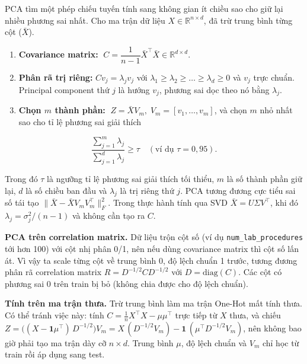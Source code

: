 \documentclass[a4paper]{report}
\begin{document}
PCA tìm một phép chiếu tuyến tính sang không gian ít chiều sao cho giữ lại nhiều phương sai nhất. Cho ma trận dữ liệu $X \in \mathbb{R}^{n \times d}$, đã trừ trung bình từng cột ($\bar{X}$).

\begin{enumerate}
  \item \textbf{Covariance matrix:} $\;C = \dfrac{1}{n-1}\bar{X}^{\top}\bar{X} \in \mathbb{R}^{d\times d}$.
  \item \textbf{Phân rã trị riêng:} $C v_j = \lambda_j v_j$ với $\lambda_1 \ge \lambda_2 \ge \dots \ge \lambda_d \ge 0$ và $v_j$ trực chuẩn. Principal component thứ $j$ là hướng $v_j$, phương sai dọc theo nó bằng $\lambda_j$.
  \item \textbf{Chọn $m$ thành phần:} $\;Z = \bar{X} V_m,\; V_m = [v_1,\dots,v_m]$, và chọn $m$ nhỏ nhất sao cho tỉ lệ phương sai giải thích
\end{enumerate}

\begin{equation}
  \frac{\sum_{j=1}^{m}\lambda_j}{\sum_{j=1}^{d}\lambda_j} \ge \tau \quad(\text{ví dụ } \tau = 0{,}95).
\end{equation}

Trong đó $\tau$ là ngưỡng tỉ lệ phương sai giải thích tối thiểu, $m$ là số thành phần giữ lại, $d$ là số chiều ban đầu và $\lambda_j$ là trị riêng thứ $j$. PCA tương đương cực tiểu sai số tái tạo $\lVert \bar{X} - \bar{X}V_mV_m^{\top}\rVert_F^2$. Trong thực hành tính qua SVD $\bar{X} = U\Sigma V^{\top}$, khi đó $\lambda_j = \sigma_j^2/(n-1)$ và không cần tạo ra $C$.

\textbf{PCA trên correlation matrix.} Dữ liệu trộn cột số (ví dụ \texttt{num\_\allowbreak{}lab\_\allowbreak{}procedures} tới hơn 100) với cột nhị phân 0/1, nên nếu dùng covariance matrix thì cột số lấn át. Vì vậy ta scale từng cột về trung bình 0, độ lệch chuẩn 1 trước, tương đương phân rã correlation matrix $R = D^{-1/2} C D^{-1/2}$ với $D = \mathrm{diag}(C)$. Các cột có phương sai 0 trên train bị bỏ (không chia được cho độ lệch chuẩn).

\textbf{Tính trên ma trận thưa.} Trừ trung bình làm ma trận One-Hot mất tính thưa. Có thể tránh việc này: tính $C = \frac{1}{n}X^{\top}X - \mu\mu^{\top}$ trực tiếp từ $X$ thưa, và chiếu $Z = \big((X - \mathbf{1}\mu^{\top})\,D^{-1/2}\big)V_m = X\,(D^{-1/2}V_m) - \mathbf{1}\,(\mu^{\top}D^{-1/2}V_m)$, nên không bao giờ phải tạo ma trận dày cỡ $n \times d$. Trung bình $\mu$, độ lệch chuẩn và $V_m$ chỉ học từ train rồi áp dụng sang test.
\end{document}
